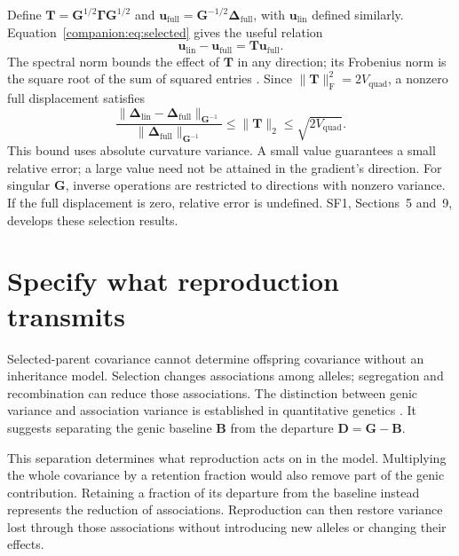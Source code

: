 Define $\mathbf T=\mathbf G^{1/2}\boldsymbol\Gamma\mathbf G^{1/2}$ and
$\mathbf u_{\mathrm{full}}=\mathbf G^{-1/2}
\boldsymbol\Delta_{\mathrm{full}}$, with $\mathbf u_{\mathrm{lin}}$ defined
similarly. Equation~\eqref{companion:eq:selected} gives the useful relation
\begin{equation}
 \mathbf u_{\mathrm{lin}}-\mathbf u_{\mathrm{full}}
     =\mathbf T\mathbf u_{\mathrm{full}}.
 \label{companion:eq:error-relation}
\end{equation}
The spectral norm bounds the effect of $\mathbf T$ in any direction; its
Frobenius norm is the square root of the sum of squared entries
\citep{BoydVandenberghe2004}.
Since $\|\mathbf T\|_{\mathrm F}^2=2V_{\mathrm{quad}}$, a nonzero full
displacement satisfies
\begin{equation}
 \frac{\|\boldsymbol\Delta_{\mathrm{lin}}
             -\boldsymbol\Delta_{\mathrm{full}}\|_{\mathbf G^{-1}}}
      {\|\boldsymbol\Delta_{\mathrm{full}}\|_{\mathbf G^{-1}}}
 \leq\|\mathbf T\|_2
 \leq\sqrt{2V_{\mathrm{quad}}}.
 \label{companion:eq:bound}
\end{equation}
This bound uses absolute curvature variance. A small value guarantees a
small relative error; a large value need not be attained in the gradient's
direction. For singular $\mathbf G$, inverse operations are restricted to
directions with nonzero variance. If the full displacement is zero, relative
error is undefined. SF1, Sections~5 and~9, develops these selection results.

\clearpage
\section{Specify what reproduction transmits}
\label{companion:inheritance}

Selected-parent covariance cannot determine offspring covariance without
an inheritance model. Selection changes associations among alleles;
segregation and recombination can reduce those associations. The distinction
between genic variance and association variance is established in
quantitative genetics \citep{Bulmer1971,Bulmer1974,BartonTurelli1991}.
It suggests separating the genic baseline $\mathbf B$ from the departure
$\mathbf D=\mathbf G-\mathbf B$.

This separation determines what reproduction acts on in the model.
Multiplying the whole covariance by a retention fraction would also remove
part of the genic contribution. Retaining a fraction of its departure from
the baseline instead represents the reduction of associations. Reproduction
can then restore variance lost through those associations without
introducing new alleles or changing their effects.

